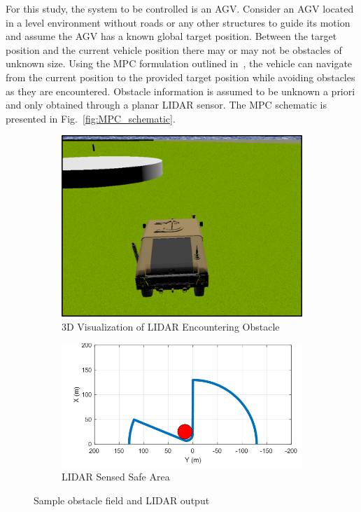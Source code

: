 \documentclass[12pt,onecolumn]{article}
\begin{document}
For this study, the system to be controlled is an AGV. Consider an AGV located in a level environment without roads or any other structures to guide its motion and assume the AGV has a known global target position. Between the target position and the current vehicle position there may or may not be obstacles of unknown size. Using the MPC formulation outlined in~\cite{ModelFidelity2016}, the vehicle can navigate from the current position to the provided target position while avoiding obstacles as they are encountered. Obstacle information is assumed to be unknown a priori and only obtained through a planar LIDAR sensor. The MPC schematic is presented in Fig.~\ref{fig:MPC_schematic}.
%

\begin{figure}
	\centering
	\begin{subfigure}[b]{\columnwidth}
		\centering
		\includegraphics[width=0.8\columnwidth]{Figs/incomingObst.png}
		\caption{{\small 3D Visualization of LIDAR Encountering Obstacle}}   
		\label{fig:obstacle_field_3D}
	\end{subfigure}
	\hfill
	\begin{subfigure}[b]{\columnwidth}
		\centering
		\includegraphics[width=\columnwidth]{Figs/obstLIDAR.png}
		\caption{\small LIDAR Sensed Safe Area}   
		\label{fig:obstacle_field_LIDAR}
	\end{subfigure}
	\caption{\small Sample obstacle field and LIDAR output}
	\label{fig:LIDARExample}
\end{figure}
\end{document}
